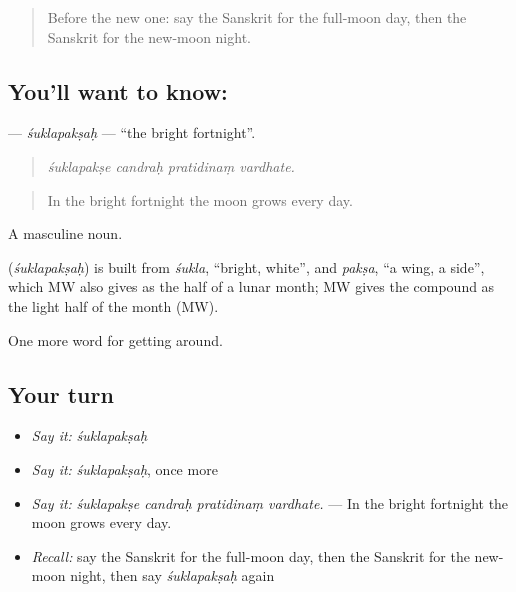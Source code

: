 \label{lesson:SA-C444-suklapaksah}



\begin{quote}
Before the new one: say the Sanskrit for the full-moon day, then the Sanskrit for the new-moon night.
\end{quote}

\subsection*{You'll want to know: }
\textbf{} — \emph{śuklapakṣaḥ} — \textquotedblleft{}the bright fortnight\textquotedblright{}.

\begin{quote}
   
\end{quote}

\begin{quote}
\emph{śuklapakṣe candraḥ pratidinaṃ vardhate.}
\end{quote}

\begin{quote}
In the bright fortnight the moon grows every day.
\end{quote}

A masculine noun.

\begin{cousinweb}
\textbf{} (\emph{śuklapakṣaḥ}) is built from \emph{śukla}, \textquotedblleft{}bright, white\textquotedblright{}, and \emph{pakṣa}, \textquotedblleft{}a wing, a side\textquotedblright{}, which MW also gives as the half of a lunar month; MW gives the compound as the light half of the month (MW).
\end{cousinweb}

\begin{grammarlens}[title={What you've built}]
One more word for getting around.
\end{grammarlens}

\subsection*{Your turn}
\begin{itemize}
\raggedright
  \item \emph{Say it:} \emph{śuklapakṣaḥ}
  \item \emph{Say it:} \emph{śuklapakṣaḥ}, once more
  \item \emph{Say it:} \emph{śuklapakṣe candraḥ pratidinaṃ vardhate.} — In the bright fortnight the moon grows every day.
  \item \emph{Recall:} say the Sanskrit for the full-moon day, then the Sanskrit for the new-moon night, then say \emph{śuklapakṣaḥ} again
\end{itemize}

